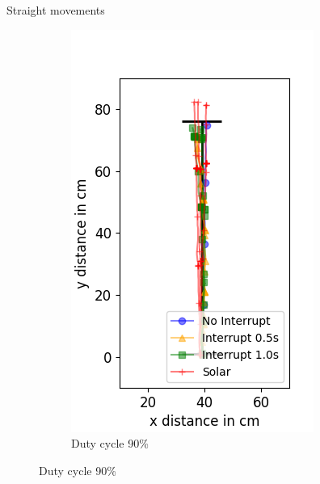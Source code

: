 \documentclass{beamer}
\begin{document}
\begin{frame}{Straight movements}
\begin{figure}
\begin{subfigure}[b]{0.32\textwidth}
			\includegraphics[width=\textwidth]{pics/straight_90.png}
			\caption*{Duty cycle 90\%}
		\end{subfigure}
	\end{figure}
\end{frame}
\end{document}
